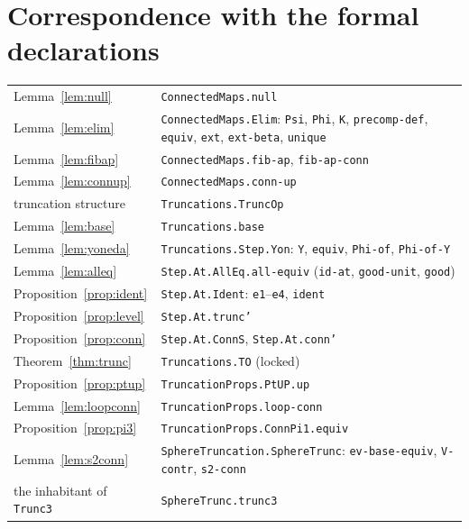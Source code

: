 \documentclass[11pt]{amsart}
\theoremstyle{definition}
\theoremstyle{remark}
\newcommand{\code}[1]{\texttt{#1}}
\begin{document}
\section{Correspondence with the formal declarations}\label{sec:corr}

\begin{tabular}{ll}
Lemma~\ref{lem:null} & \code{ConnectedMaps.null} \\
Lemma~\ref{lem:elim} & \code{ConnectedMaps.Elim}: \code{Psi}, \code{Phi}, \code{K}, \code{precomp-def}, \code{equiv}, \code{ext}, \code{ext-beta}, \code{unique}\\
Lemma~\ref{lem:fibap} & \code{ConnectedMaps.fib-ap}, \code{fib-ap-conn}\\
Lemma~\ref{lem:connup} & \code{ConnectedMaps.conn-up}\\
truncation structure & \code{Truncations.TruncOp}\\
Lemma~\ref{lem:base} & \code{Truncations.base}\\
Lemma~\ref{lem:yoneda} & \code{Truncations.Step.Yon}: \code{Y}, \code{equiv}, \code{Phi-of}, \code{Phi-of-Y}\\
Lemma~\ref{lem:alleq} & \code{Step.At.AllEq.all-equiv} (\code{id-at}, \code{good-unit}, \code{good})\\
Proposition~\ref{prop:ident} & \code{Step.At.Ident}: \code{e1}--\code{e4}, \code{ident}\\
Proposition~\ref{prop:level} & \code{Step.At.trunc'}\\
Proposition~\ref{prop:conn} & \code{Step.At.ConnS}, \code{Step.At.conn'}\\
Theorem~\ref{thm:trunc} & \code{Truncations.TO} (locked)\\
Proposition~\ref{prop:ptup} & \code{TruncationProps.PtUP.up}\\
Lemma~\ref{lem:loopconn} & \code{TruncationProps.loop-conn}\\
Proposition~\ref{prop:pi3} & \code{TruncationProps.ConnPi1.equiv}\\
Lemma~\ref{lem:s2conn} & \code{SphereTruncation.SphereTrunc}: \code{ev-base-equiv}, \code{V-contr}, \code{s2-conn}\\
the inhabitant of \code{Trunc3} & \code{SphereTrunc.trunc3}
\end{tabular}
\end{document}
